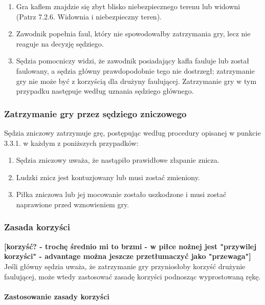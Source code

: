 \documentclass[12pt]{article}
\begin{document}
\begin{enumerate}
	\item Gra kaflem znajdzie się zbyt blisko niebezpiecznego terenu lub
	      widowni (Patrz 7.2.6. Widownia i niebezpieczny teren).

	\item Zawodnik popełnia faul, który nie spowodowałby zatrzymania gry, lecz
	      nie reaguje na decyzję sędziego.

	\item Sędzia pomocniczy widzi, że zawodnik posiadający kafla fauluje lub
	      został faulowany, a sędzia główny prawdopodobnie tego nie dostrzegł;
	      zatrzymanie gry nie może być z korzyścią dla drużyny faulującej.
	      Zatrzymanie gry w tym przypadku następuje według uznania sędziego
	      głównego.
\end{enumerate}

\subsubsection{Zatrzymanie gry przez sędziego zniczowego}

Sędzia zniczowy zatrzymuje grę, postępując według procedury opisanej w
punkcie 3.3.1. w każdym z poniższych przypadków:

\begin{enumerate}
	\item
	      Sędzia zniczowy uważa, że nastąpiło prawidłowe złapanie znicza.
	\item
	      Ludzki znicz jest kontuzjowany lub musi zostać zmieniony.
	\item
	      Piłka zniczowa lub jej mocowanie zostało uszkodzone i musi zostać
	      naprawione przed wznowieniem gry.
\end{enumerate}

\subsubsection{Zasada korzyści}
\textbf{[korzyść? - trochę średnio mi to brzmi - w piłce nożnej jest "przywilej korzyści" - advantage można jeszcze przetłumaczyć jako "przewaga"]}
Jeśli główny sędzia uważa, że zatrzymanie gry przyniosłoby korzyść
drużynie faulującej, może wtedy zastosować zasadę korzyści podnosząc
wyprostowaną rękę.

\paragraph{Zastosowanie zasady korzyści}
\end{document}
